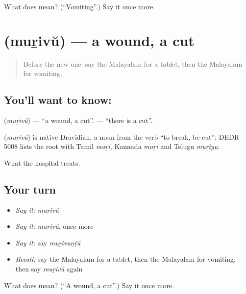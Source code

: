 \begin{tcolorbox}[breakable,colback=teal!4,colframe=teal!35!black,title={Before you move on}]
What does  mean? (\textquotedblleft{}Vomiting\textquotedblright{}.) Say it once more.
\end{tcolorbox}
\section[\texorpdfstring{\ml{മുറിവ്} (muṟivŭ)}{മുറിവ് (muṟivŭ)}]{ (muṟivŭ) — a wound, a cut}

\label{lesson:ML-C117-wound}



\begin{quote}
Before the new one: say the Malayalam for a tablet, then the Malayalam for vomiting.
\end{quote}

\subsection*{You'll want to know: }
\textbf{} (\emph{muṟivŭ}) — \textquotedblleft{}a wound, a cut\textquotedblright{}. \textbf{} — \textquotedblleft{}there is a cut\textquotedblright{}.

\begin{cousinweb}
\textbf{} (\emph{muṟivŭ}) is native Dravidian, a noun from the verb \textquotedblleft{}to break, be cut\textquotedblright{}; DEDR 5008 lists the root with Tamil \emph{muṟi}, Kannada \emph{muṟi} and Telugu \emph{muṟiyu}.
\end{cousinweb}

\begin{grammarlens}[title={What you've built}]
What the hospital treats.
\end{grammarlens}

\subsection*{Your turn}
\begin{itemize}
\raggedright
  \item \emph{Say it:} \emph{muṟivŭ}
  \item \emph{Say it:} \emph{muṟivŭ}, once more
  \item \emph{Say it:} say \emph{muṟivuṇṭŭ}
  \item \emph{Recall:} say the Malayalam for a tablet, then the Malayalam for vomiting, then say \emph{muṟivŭ} again
\end{itemize}

\begin{tcolorbox}[breakable,colback=teal!4,colframe=teal!35!black,title={Before you move on}]
What does  mean? (\textquotedblleft{}A wound, a cut\textquotedblright{}.) Say it once more.
\end{tcolorbox}
